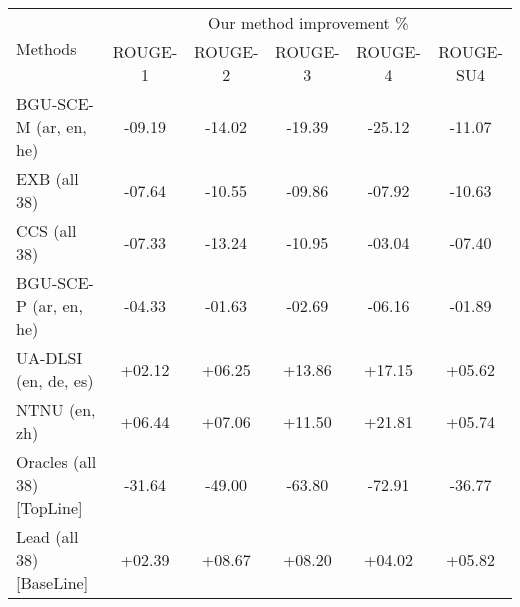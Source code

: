 \begin{tabular*}{\textwidth}{@{\extracolsep{\fill}}lccccc} 
\hline \hline
\multirow{2}{*}{Methods} & \multicolumn{5}{c}{Our method improvement \%}\\
\cline{2-6}
							& ROUGE-1	& ROUGE-2	& ROUGE-3	& ROUGE-4	& ROUGE-SU4\\
\hline
BGU-SCE-M (ar, en, he)		& -09.19	& -14.02	& -19.39	& -25.12	& -11.07\\
EXB (all 38)				& -07.64	& -10.55	& -09.86	& -07.92	& -10.63\\
CCS (all 38)				& -07.33	& -13.24	& -10.95	& -03.04	& -07.40\\
BGU-SCE-P (ar, en, he)		& -04.33	& -01.63	& -02.69	& -06.16	& -01.89\\
UA-DLSI (en, de, es)		& +02.12	& +06.25	& +13.86	& +17.15	& +05.62\\
NTNU (en, zh)				& +06.44	& +07.06	& +11.50	& +21.81	& +05.74\\
\hline
Oracles (all 38) [TopLine]	& -31.64	& -49.00	& -63.80	& -72.91	& -36.77\\
Lead (all 38) [BaseLine]	& +02.39	& +08.67	& +08.20	& +04.02	& +05.82\\
\hline \hline
\end{tabular*}
